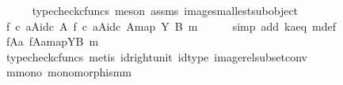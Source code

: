 \begin{isabellebody}
\ \ \ \ \isamarkupfalse%
\ {\isacharparenleft}{\kern0pt}typecheck{\isacharunderscore}{\kern0pt}cfuncs{\isacharcomma}{\kern0pt}\ meson\ assms{\isacharparenleft}{\kern0pt}{}{\isacharparenright}{\kern0pt}\ image{\isacharunderscore}{\kern0pt}smallest{\isacharunderscore}{\kern0pt}subobject{\isacharparenright}{\kern0pt}\isanewline
\ \ \isamarkupfalse%
\ \isamarkupfalse%
\ {\isachardoublequoteopen}{\isacharparenleft}{\kern0pt}{\isacharparenleft}{\kern0pt}f\ {\isasymcirc}\isactrlsub c\ a{\isacharparenright}{\kern0pt}{\isasymlparr}A{\isasymrparr}\isactrlbsub id\isactrlsub c\ A\isactrlesub {\isacharcomma}{\kern0pt}\ {\isacharbrackleft}{\kern0pt}{\isacharparenleft}{\kern0pt}f\ {\isasymcirc}\isactrlsub c\ a{\isacharparenright}{\kern0pt}{\isasymlparr}A{\isasymrparr}\isactrlbsub id\isactrlsub c\ A\isactrlesub {\isacharbrackright}{\kern0pt}map{\isacharparenright}{\kern0pt}\ {\isasymsubseteq}\isactrlbsub Y\isactrlesub \ {\isacharparenleft}{\kern0pt}B{\isacharcomma}{\kern0pt}\ m{\isacharparenright}{\kern0pt}{\isachardoublequoteclose}\isanewline
\ \ \ \ \isamarkupfalse%
\ {\isacharparenleft}{\kern0pt}simp\ add{\isacharcolon}{\kern0pt}\ k{\isacharunderscore}{\kern0pt}a{\isacharunderscore}{\kern0pt}eq\ m{\isacharprime}{\kern0pt}{\isacharunderscore}{\kern0pt}def{\isacharparenright}{\kern0pt}\ \ \ \isanewline
\ \ \isamarkupfalse%
\ \isamarkupfalse%
\ {\isachardoublequoteopen}{\isacharparenleft}{\kern0pt}f{\isasymlparr}A{\isasymrparr}\isactrlbsub a\isactrlesub {\isacharcomma}{\kern0pt}\ {\isacharbrackleft}{\kern0pt}f{\isasymlparr}A{\isasymrparr}\isactrlbsub a\isactrlesub {\isacharbrackright}{\kern0pt}map{\isacharparenright}{\kern0pt}{\isasymsubseteq}\isactrlbsub Y\isactrlesub {\isacharparenleft}{\kern0pt}B{\isacharcomma}{\kern0pt}\ m{\isacharparenright}{\kern0pt}{\isachardoublequoteclose}\isanewline
\ \ \ \ \isamarkupfalse%
\ {\isacharparenleft}{\kern0pt}typecheck{\isacharunderscore}{\kern0pt}cfuncs{\isacharcomma}{\kern0pt}\ metis\ id{\isacharunderscore}{\kern0pt}right{\isacharunderscore}{\kern0pt}unit{}\ id{\isacharunderscore}{\kern0pt}type\ image{\isacharunderscore}{\kern0pt}rel{\isacharunderscore}{\kern0pt}subset{\isacharunderscore}{\kern0pt}conv{\isacharparenright}{\kern0pt}\isanewline
{}\isamarkupfalse%
\isanewline
\ \ \isamarkupfalse%
\ m{\isacharunderscore}{\kern0pt}mono{\isacharcolon}{\kern0pt}\ {\isachardoublequoteopen}monomorphism{\isacharparenleft}{\kern0pt}m{\isacharparenright}{\kern0pt}{\isachardoublequoteclose}\isanewline

\end{isabellebody}
